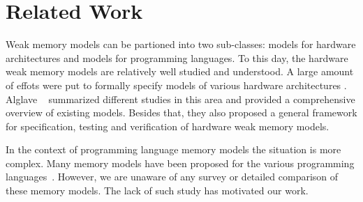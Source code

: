 \section{Related Work}

Weak memory models can be partioned into two sub-classes: 
models for hardware architectures and models for programming languages. 
To this day, the hardware weak memory models are relatively well studied and understood.
A large amount of effots were put to formally specify models of various 
hardware architectures%
\cite{Chong-ASPLOS08, Alglave-DAMP09, Sewell-al:CACM10, Sarkar-al:PLDI11, Flur-al:POPL16, Pulte-al:POPL18}.
Alglave \etal~\cite{Alglave-al:TOPLAS14} summarized different studies in this area 
and provided a comprehensive overview of existing models.  
Besides that, they also proposed a general framework for specification, 
testing and verification of hardware weak memory models.

In the context of programming language memory models the situation is more complex. 
Many memory models have been proposed for the various programming languages~\cite{
Manson-al:POPL05, Batty-al:POPL11, Batty-el:POPL16, 
Dolan-al:PLDI18, Watt-el:OOPSLA19, Watt-el:PLDI2020, 
Jeffrey-Riely:LICS16, PichonPharabod-Sewell:POPL16, 
Podkopaev-al:CoRR16, Kang-al:POPL17, Chakraborty-Vafeiadis:POPL19, 
Paviotti-el:ESOP20, Lee-el:PLDI20}.
However, we are unaware of any survey or detailed comparison of these memory models.
The lack of such study has motivated our work.

